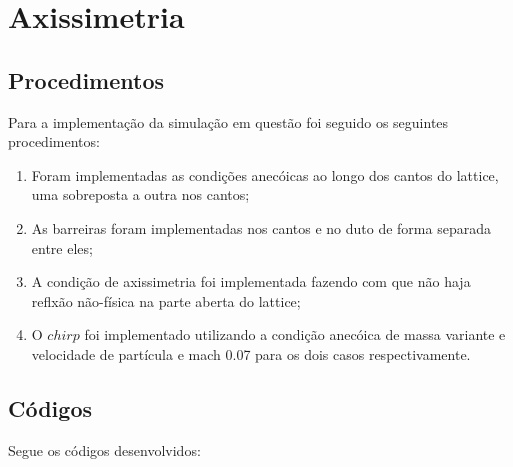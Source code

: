\chapter{Axissimetria}\label{parte_1}

\section{Procedimentos}
Para a implementação da simulação em questão foi seguido os seguintes procedimentos:
\begin{enumerate}
    \item Foram implementadas as condições anecóicas ao longo dos cantos do lattice, uma sobreposta a outra nos cantos;
    \item As barreiras foram implementadas nos cantos e no duto de forma separada entre eles;
    \item A condição de axissimetria foi implementada fazendo com que não haja reflxão não-física na parte aberta do lattice;
    \item O $chirp$ foi implementado utilizando a condição anecóica de massa variante e velocidade de partícula e mach 0.07 para os dois casos respectivamente.
\end{enumerate}

\section{Códigos}
Segue os códigos desenvolvidos:




\newpage
